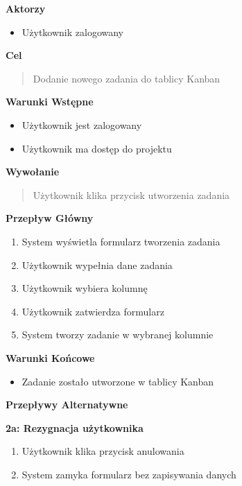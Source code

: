 \noindent\textbf{Aktorzy}
\begin{itemize}
    \item Użytkownik zalogowany
\end{itemize}

\vspace{0.2cm}
\noindent\textbf{Cel}
\begin{quote}
    Dodanie nowego zadania do tablicy Kanban
\end{quote}

\vspace{0.2cm}
\noindent\textbf{Warunki Wstępne}
\begin{itemize}
    \item Użytkownik jest zalogowany
    \item Użytkownik ma dostęp do projektu
\end{itemize}

\vspace{0.2cm}
\noindent\textbf{Wywołanie}
\begin{quote}
    Użytkownik klika przycisk utworzenia zadania
\end{quote}

\vspace{0.2cm}
\noindent\textbf{Przepływ Główny}
\begin{enumerate}
    \item System wyświetla formularz tworzenia zadania
    \item Użytkownik wypełnia dane zadania
    \item Użytkownik wybiera kolumnę
    \item Użytkownik zatwierdza formularz
    \item System tworzy zadanie w wybranej kolumnie
\end{enumerate}

\vspace{0.2cm}
\noindent\textbf{Warunki Końcowe}
\begin{itemize}
    \item Zadanie zostało utworzone w tablicy Kanban
\end{itemize}

\vspace{0.2cm}
\noindent\textbf{Przepływy Alternatywne}

\textbf{2a: Rezygnacja użytkownika}
\begin{enumerate}
    \item Użytkownik klika przycisk anulowania
    \item System zamyka formularz bez zapisywania danych
\end{enumerate}

